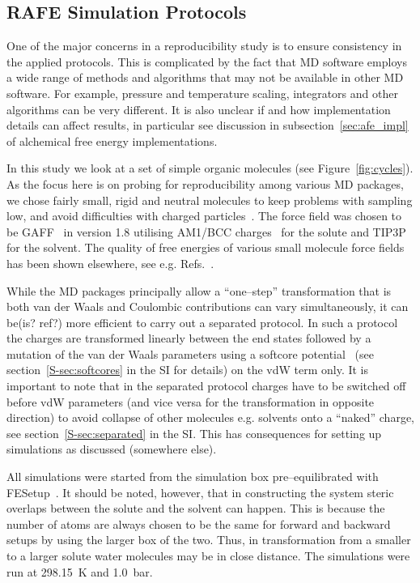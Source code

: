 \documentclass[journal=jctcce,manuscript=article]{achemso}
\begin{document}
\subsection{RAFE Simulation Protocols}
\label{sec:rafe_protocols}

One of the major concerns in a reproducibility study is to ensure
consistency in the applied protocols.  This is complicated by the fact
that MD software employs a wide range of methods and algorithms that
may not be available in other MD software.  For example, pressure and
temperature scaling, integrators and other algorithms can be very
different.  It is also unclear if and how implementation details can
affect results, in particular see discussion in
subsection~\ref{sec:afe_impl} of alchemical free energy
implementations.

In this study we look at a set of simple organic molecules (see
Figure~\ref{fig:cycles}).  As the focus here is on probing for
reproducibility among various MD packages, we chose fairly small,
rigid and neutral molecules to keep problems with sampling low, and
avoid difficulties with charged
particles~\cite{rocklin_calculating_2013, JCC:JCC1050}.  The force
field was chosen to be GAFF~\cite{wang_development_2004} in version
1.8 utilising AM1/BCC charges~\cite{jakalian_fast_2000,
  jakalian_fast_2002} for the solute and
TIP3P~\cite{jorgensen_comparison_1983-1} for the solvent.  The quality
of free energies of various small molecule force fields has been shown
elsewhere, see e.g. Refs.~.

While the MD packages principally allow a ``one--step'' transformation
that is both van der Waals and Coulombic contributions can vary
simultaneously, it can be(is? ref?) more efficient to carry out a
separated protocol.  In such a protocol the charges are transformed
linearly between the end states followed by a mutation of the van der
Waals parameters using a softcore
potential~\cite{beutler_avoiding_1994,
  zacharias_separationshifted_1994} (see section~\ref{S-sec:softcores} in the SI for details) on the vdW
term only.  It is important to note that in the separated protocol
charges have to be switched off before vdW parameters (and vice versa
for the transformation in opposite direction) to avoid collapse of
other molecules e.g. solvents onto a ``naked'' charge, see section~\ref{S-sec:separated} in the SI.  This
has consequences for setting up simulations as discussed (somewhere
else).

All simulations were started from the simulation box pre--equilibrated with
FESetup~\cite{loeffler_fesetup:_2015}.  It should be noted, however, that in
constructing the system steric overlaps between the solute and the solvent can
happen.  This is because the number of atoms are always chosen to be the same
for forward and backward setups by using the larger box of the two.  Thus, in
transformation from a smaller to a larger solute water molecules may be in
close distance.  The simulations were run at \SI{298.15}{K} and \SI{1.0}{bar}.
\end{document}
